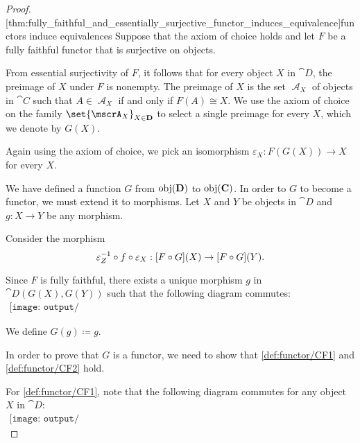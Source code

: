 \begin{proof}
  [thm:fully_faithful_and_essentially_surjective_functor_induces_equivalence]{functors induce equivalences} Suppose that the axiom of choice holds and let \( F \) be a fully faithful functor that is surjective on objects.

  From essential surjectivity of \( F \), it follows that for every object \( X \) in \( \cat{D} \), the preimage of \( X \) under \( F \) is nonempty. The preimage of \( X \) is the set \( \mscrA_X \) of objects in \( \cat{C} \) such that \( A \in \mscrA_X \) if and only if \( F(A) \cong X \). We use the axiom of choice on the family \( \set{ \mscrA_X }_{X \in \cat{D}} \) to select a single preimage for every \( X \), which we denote by \( G(X) \).

  Again using the axiom of choice, we pick an isomorphism \( \varepsilon_X: F(G(X)) \to X \) for every \( X \).

  We have defined a function \( G \) from \( \operatorname{obj}(\operatorname{\mathbf{D}}) \) to \( \operatorname{obj}(\operatorname{\mathbf{C}}) \). In order to \( G \) to become a functor, we must extend it to morphisms. Let \( X \) and \( Y \) be objects in \( \cat{D} \) and \( g: X \to Y \) be any morphism.

  Consider the morphism
  \begin{equation*}
    \varepsilon_Z^{-1} \bincirc f \bincirc \varepsilon_X: [F \bincirc G](X) \to [F \bincirc G](Y).
  \end{equation*}

  Since \( F \) is fully faithful, there exists a unique morphism \( g \) in \( \cat{D}(G(X), G(Y)) \) such that the following diagram commutes:
  \begin{equation}\label{eq:thm:fully_faithful_and_essentially_surjective_functor_induces_equivalence/inverse_morphism_definition}
    \begin{aligned}
      \texttt{[image: output/thm\_\_fully\_faithful\_and\_essentially\_surjective\_functor\_induces\_equivalence]}
    \end{aligned}
  \end{equation}

  We define \( G(g) \coloneqq g \).

  In order to prove that \( G \) is a functor, we need to show that \ref{def:functor/CF1} and \ref{def:functor/CF2} hold.

  For \ref{def:functor/CF1}, note that the following diagram commutes for any object \( X \) in \( \cat{D} \):
  \begin{equation}\label{eq:thm:fully_faithful_and_essentially_surjective_functor_induces_equivalence/identity}
    \begin{aligned}
      \texttt{[image: output/thm\_\_fully\_faithful\_and\_essentially\_surjective\_functor\_induces\_equivalence]}
    \end{aligned}
  \end{equation}


\end{proof}
